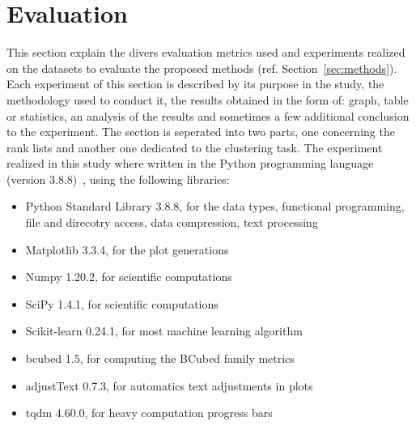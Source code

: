 \section{Evaluation \label{sec:evaluation}}

This section explain the divers evaluation metrics used and experiments realized on the datasets to evaluate the proposed methods (ref. Section~\ref{sec:methods}).
Each experiment of this section is described by its purpose in the study, the methodology used to conduct it, the results obtained in the form of: graph, table or statistics, an analysis of the results and sometimes a few additional conclusion to the experiment.
The section is seperated into two parts, one concerning the rank lists and another one dedicated to the clustering task.
The experiment realized in this study where written in the Python programming language (version 3.8.8)~\cite{python}, using the following libraries:
\begin{itemize}
  \item Python Standard Library 3.8.8, for the data types, functional programming, file and direcotry access, data compression, text processing~\cite{python_standard_library}
  \item Matplotlib 3.3.4, for the plot generations~\cite{matplotlib}
  \item Numpy 1.20.2, for scientific computations~\cite{numpy}
  \item SciPy 1.4.1, for scientific computations~\cite{scipy}
  \item Scikit-learn 0.24.1, for most machine learning algorithm~\cite{sklearn}
  \item bcubed 1.5, for computing the BCubed family metrics~\cite{bcubed_gh}
  \item adjustText 0.7.3, for automatics text adjustments in plots~\cite{adjustText}
  \item tqdm 4.60.0, for heavy computation progress bars~\cite{tqdm}
\end{itemize}






